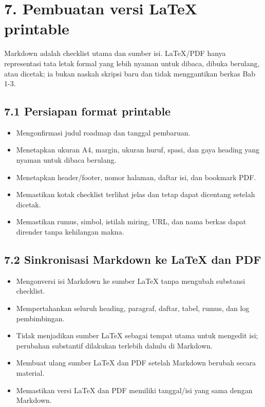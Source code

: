 \documentclass[
  indonesian,
  11pt,
]{article}
\providecommand{\tightlist}{%
  \setlength{\itemsep}{0pt}\setlength{\parskip}{0pt}}
\renewcommand{\tightlist}{%
  \setlength{\itemsep}{0.22em}%
  \setlength{\parskip}{0pt}%
}
\begin{document}
\section{7. Pembuatan versi LaTeX
printable}\label{pembuatan-versi-latex-printable}

Markdown adalah checklist utama dan sumber isi. LaTeX/PDF hanya
representasi tata letak formal yang lebih nyaman untuk dibaca, dibuka
berulang, atau dicetak; ia bukan naskah skripsi baru dan tidak
menggantikan berkas Bab 1-3.

\subsection{7.1 Persiapan format
printable}\label{persiapan-format-printable}

\begin{itemize}
\tightlist
\item[$\square$]
  Mengonfirmasi judul roadmap dan tanggal pembaruan.
\item[$\square$]
  Menetapkan ukuran A4, margin, ukuran huruf, spasi, dan gaya heading
  yang nyaman untuk dibaca berulang.
\item[$\square$]
  Menetapkan header/footer, nomor halaman, daftar isi, dan bookmark PDF.
\item[$\square$]
  Memastikan kotak checklist terlihat jelas dan tetap dapat dicentang
  setelah dicetak.
\item[$\square$]
  Memastikan rumus, simbol, istilah miring, URL, dan nama berkas dapat
  dirender tanpa kehilangan makna.
\end{itemize}

\subsection{7.2 Sinkronisasi Markdown ke LaTeX dan
PDF}\label{sinkronisasi-markdown-ke-latex-dan-pdf}

\begin{itemize}
\tightlist
\item[$\square$]
  Mengonversi isi Markdown ke sumber LaTeX tanpa mengubah substansi
  checklist.
\item[$\square$]
  Mempertahankan seluruh heading, paragraf, daftar, tabel, rumus, dan
  log pembimbingan.
\item[$\square$]
  Tidak menjadikan sumber LaTeX sebagai tempat utama untuk mengedit isi;
  perubahan substantif dilakukan terlebih dahulu di Markdown.
\item[$\square$]
  Membuat ulang sumber LaTeX dan PDF setelah Markdown berubah secara
  material.
\item[$\square$]
  Memastikan versi LaTeX dan PDF memiliki tanggal/isi yang sama dengan
  Markdown.
\end{itemize}
\end{document}
